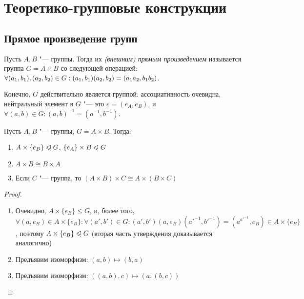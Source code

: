 \section{Теоретико-групповые конструкции}

\subsection{Прямое произведение групп}

\begin{definition}
	Пусть $A, B$ "--- группы. Тогда их \textit{(внешним) прямым произведением} называется группа $G = A \times B$ со следующей операцией: $\forall (a_1, b_1), (a_2, b_2) \in G: (a_1, b_1)(a_2, b_2) \hm= (a_1a_2, b_1b_2)$.
\end{definition}

\begin{note}
	Конечно, $G$ действительно является группой: ассоциативность очевидна, нейтральный элемент в $G$ "--- это $e = (e_A, e_B)$, и $\forall (a, b) \in G: (a, b)^{-1} = (a^{-1}, b^{-1})$.
\end{note}

\begin{proposition}
	Пусть $A, B$ "--- группы, $G = A\times B$. Тогда:
	\begin{enumerate}
		\item $A \times \{e_B\} \trianglelefteqslant G$, $\{e_A\} \times B \trianglelefteqslant G$
		\item $A \times B \cong B \times A$
		\item Если $C$ "--- группа, то $(A \times B) \times C \cong A \times (B \times C)$
	\end{enumerate}
\end{proposition}

\begin{proof}~
	\begin{enumerate}
		\item Очевидно, $A \times \{e_B\} \le G$, и, более того, $\forall (a, e_B) \in A \times \{e_B\}: \forall (a', b') \in G: (a', b')(a, e_B)(a'^{-1}, b'^{-1}) = (a^{a'^{-1}}, e_B) \in A \times \{e_B\}$, поэтому $A \times \{e_B\} \trianglelefteqslant G$ (вторая часть утверждения доказывается аналогично)
		\item Предъявим изоморфизм: $(a, b) \mapsto (b, a)$
		\item Предъявим изоморфизм: $((a, b), c) \mapsto (a, (b, c))$
	\end{enumerate}
\end{proof}

